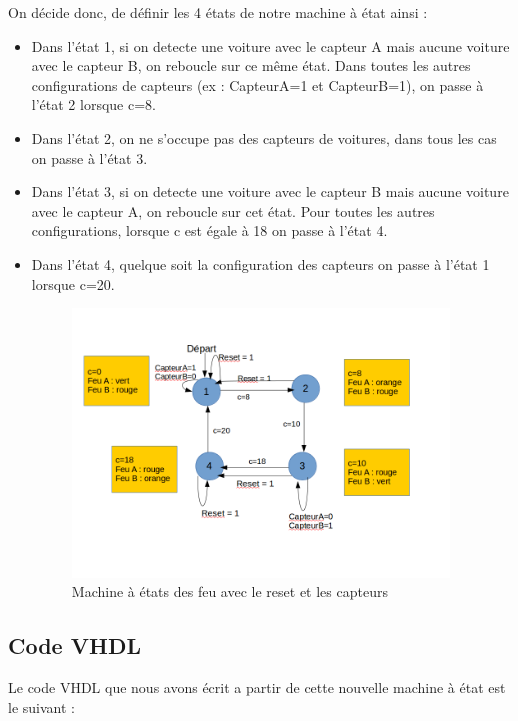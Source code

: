 \documentclass[11pt]{report}
\begin{document}
On décide donc, de définir les 4 états de notre machine à état ainsi :
\begin{itemize}
\item Dans l'état 1, si on detecte une voiture avec le capteur A mais aucune voiture avec le capteur B, on reboucle sur ce même état. Dans toutes les autres configurations de capteurs (ex : CapteurA=1 et CapteurB=1), on passe à l'état 2 lorsque c=8.
\item Dans l'état 2, on ne s'occupe pas des capteurs de voitures, dans tous les cas on passe à l'état 3.
\item Dans l'état 3, si on detecte une voiture avec le capteur B mais aucune voiture avec le capteur A, on reboucle sur cet état. Pour toutes les autres configurations, lorsque c est égale à 18 on passe à l'état 4.
\item Dans l'état 4, quelque soit la configuration des capteurs on passe à l'état 1 lorsque c=20.


\begin{figure}[h]
\includegraphics[width=10cm]{TP03-3.png}
\caption{Machine à états des feu avec le reset et les capteurs}
\end{figure}

\end{itemize}






\subsection{Code VHDL}

Le code VHDL que nous avons écrit a partir de cette nouvelle machine à état est le suivant : 
\end{document}
